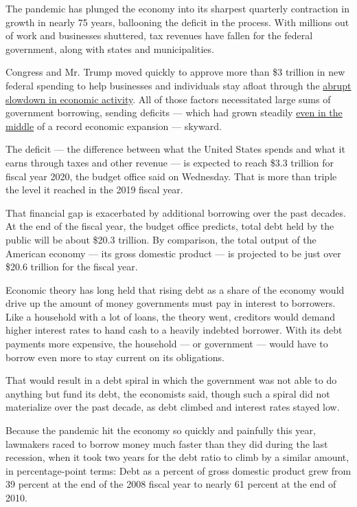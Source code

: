 The pandemic has plunged the economy into its sharpest quarterly
contraction in growth in nearly 75 years, ballooning the deficit in the
process. With millions out of work and businesses shuttered, tax
revenues have fallen for the federal government, along with states and
municipalities.

Congress and Mr. Trump moved quickly to approve more than \$3 trillion
in new federal spending to help businesses and individuals stay afloat
through the
\href{https://www.nytimes3xbfgragh.onion/2020/03/22/us/politics/coronavirus-economy-shutdown.html}{abrupt
slowdown in economic activity}. All of those factors necessitated large
sums of government borrowing, sending deficits --- which had grown
steadily
\href{https://www.nytimes3xbfgragh.onion/2020/01/13/business/budget-deficit-1-trillion-trump.html}{even
in the middle} of a record economic expansion --- skyward.

The deficit --- the difference between what the United States spends and
what it earns through taxes and other revenue --- is expected to reach
\$3.3 trillion for fiscal year 2020, the budget office said on
Wednesday. That is more than triple the level it reached in the 2019
fiscal year.

That financial gap is exacerbated by additional borrowing over the past
decades. At the end of the fiscal year, the budget office predicts,
total debt held by the public will be about \$20.3 trillion. By
comparison, the total output of the American economy --- its gross
domestic product --- is projected to be just over \$20.6 trillion for
the fiscal year.

Economic theory has long held that rising debt as a share of the economy
would drive up the amount of money governments must pay in interest to
borrowers. Like a household with a lot of loans, the theory went,
creditors would demand higher interest rates to hand cash to a heavily
indebted borrower. With its debt payments more expensive, the household
--- or government --- would have to borrow even more to stay current on
its obligations.

That would result in a debt spiral in which the government was not able
to do anything but fund its debt, the economists said, though such a
spiral did not materialize over the past decade, as debt climbed and
interest rates stayed low.

Because the pandemic hit the economy so quickly and painfully this year,
lawmakers raced to borrow money much faster than they did during the
last recession, when it took two years for the debt ratio to climb by a
similar amount, in percentage-point terms: Debt as a percent of gross
domestic product grew from 39 percent at the end of the 2008 fiscal year
to nearly 61 percent at the end of 2010.

